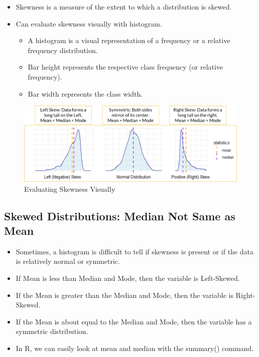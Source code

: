 \documentclass[
  letterpaper,
  DIV=11,
  numbers=noendperiod]{scrreprt}
\providecommand{\tightlist}{%
  \setlength{\itemsep}{0pt}\setlength{\parskip}{0pt}}\usepackage{longtable,booktabs,array}
\begin{document}
\begin{itemize}
\tightlist
\item
  Skewness is a measure of the extent to which a distribution is skewed.
\item
  Can evaluate skewness visually with histogram.

  \begin{itemize}
  \tightlist
  \item
    A histogram is a visual representation of a frequency or a relative
    frequency distribution.
  \item
    Bar height represents the respective class frequency (or relative
    frequency).
  \item
    Bar width represents the class width.
  \end{itemize}
\end{itemize}

\begin{figure}[H]

{\centering \includegraphics{Pictures/Ch2/Skewness.png}

}

\caption{Evaluating Skewness Visually}

\end{figure}%

\subsection{Skewed Distributions: Median Not Same as
Mean}\label{skewed-distributions-median-not-same-as-mean}

\begin{itemize}
\tightlist
\item
  Sometimes, a histogram is difficult to tell if skewness is present or
  if the data is relatively normal or symmetric.
\item
  If Mean is less than Median and Mode, then the variable is
  Left-Skewed.
\item
  If the Mean is greater than the Median and Mode, then the variable is
  Right-Skewed.
\item
  If the Mean is about equal to the Median and Mode, then the variable
  has a symmetric distribution.
\item
  In R, we can easily look at mean and median with the summary()
  command.
\end{itemize}
\end{document}
